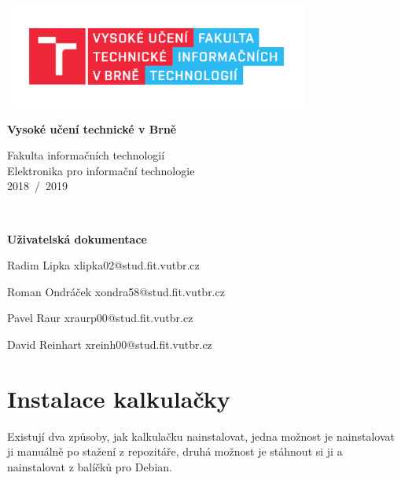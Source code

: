 \documentclass[12pt]{article}
\begin{document}
\begin{titlepage}
	\begin{center}

		\includegraphics[height = 96pt]{img/FIT_barevne_CMYK_CZ.pdf} \\

		\begin{LARGE}
			\textbf{Vysoké učení technické v Brně} \\
		\end{LARGE}

		\begin{large}
			Fakulta informačních technologií \\
			Elektronika pro informační technologie \\
			2018~/~2019 
		\end{large}
		\\[78mm]

		\begin{huge}
				\textbf{Uživatelská dokumentace} \\
			\begin{large}		
		Radim Lipka xlipka02@stud.fit.vutbr.cz
		
        Roman Ondráček xondra58@stud.fit.vutbr.cz
        
        Pavel Raur xraurp00@stud.fit.vutbr.cz
        
        David Reinhart xreinh00@stud.fit.vutbr.cz
        \end{large}
		\end{huge}
	\end{center}

	\vfill


\end{titlepage}

\tableofcontents
\newpage

\section{Instalace kalkulačky}
Existují dva způsoby, jak kalkulačku nainstalovat, jedna možnost je nainstalovat ji manuálně po stažení z repozitáře, druhá možnost je stáhnout si ji a nainstalovat z balíčků pro Debian.
\end{document}
